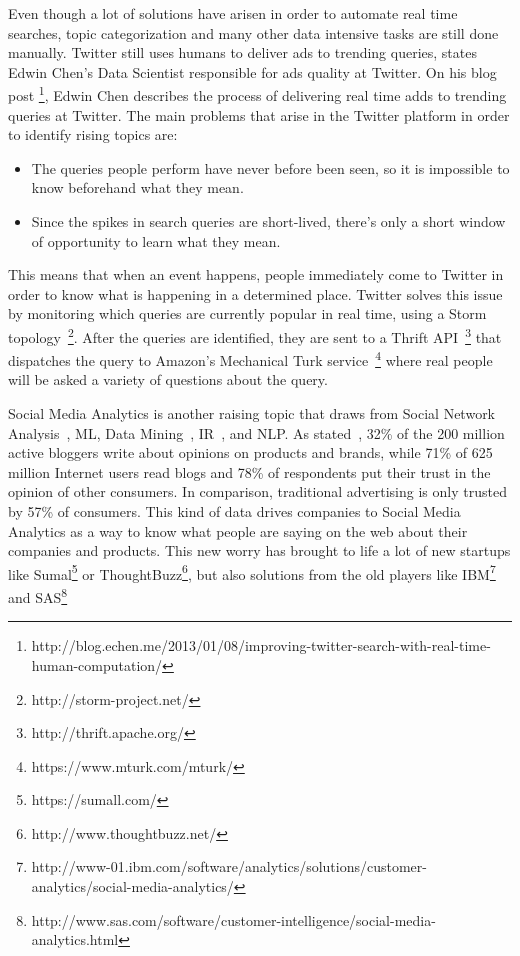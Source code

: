 Even though a lot of solutions have arisen in order to automate real time searches, topic categorization and many other data intensive tasks are still done manually. Twitter still uses humans to deliver ads to trending queries, states Edwin Chen's Data Scientist responsible for ads quality at Twitter. On his blog post \footnote{http://blog.echen.me/2013/01/08/improving-twitter-search-with-real-time-human-computation/}, Edwin Chen describes the process of delivering real time adds to trending queries at Twitter. The main problems that arise in the Twitter platform in order to identify rising topics are:
\begin{itemize}
  \item The queries people perform have never before been seen, so it is impossible to know beforehand what they mean.
  \item Since the spikes in search queries are short-lived, there's only a short window of opportunity to learn what they mean.
\end{itemize}
This means that when an event happens, people immediately come to Twitter in order to know what is happening in a determined place. Twitter solves this issue by monitoring which queries are currently popular in real time, using a Storm topology~\footnote{http://storm-project.net/}. After the queries are identified, they are sent to a Thrift API~\footnote{http://thrift.apache.org/} that dispatches the query to Amazon's Mechanical Turk service~\footnote{https://www.mturk.com/mturk/} where real people will be asked a variety of questions about the query.

Social Media Analytics is another raising topic that draws from Social Network Analysis~\cite{knoke2008social}, \ac{ML}, Data Mining~\cite{witten2005data}, \ac{IR}~\cite{salton1983introduction}, and \ac{NLP}. As stated~\citet{Melville2009}, 32\% of the 200 million active bloggers write about opinions on products and brands, while 71\% of 625 million Internet users read blogs and 78\% of respondents put their trust in the opinion of other consumers. In comparison, traditional advertising is only trusted by 57\% of consumers.
This kind of data drives companies to Social Media Analytics as a way to know what people are saying on the web about their companies and products. This new worry has brought to life a lot of new startups like Sumal\footnote{https://sumall.com/} or ThoughtBuzz\footnote{http://www.thoughtbuzz.net/}, but also solutions from the old players like IBM\footnote{http://www-01.ibm.com/software/analytics/solutions/customer-analytics/social-media-analytics/} and SAS\footnote{http://www.sas.com/software/customer-intelligence/social-media-analytics.html}

